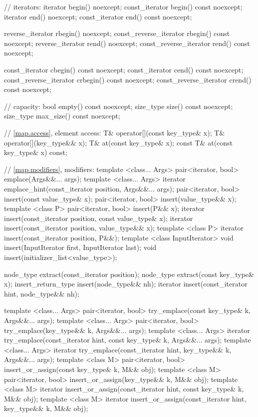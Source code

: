 \begin{codeblock}
{{    // iterators:
    iterator               begin() noexcept;
    const_iterator         begin() const noexcept;
    iterator               end() noexcept;
    const_iterator         end() const noexcept;

    reverse_iterator       rbegin() noexcept;
    const_reverse_iterator rbegin() const noexcept;
    reverse_iterator       rend() noexcept;
    const_reverse_iterator rend() const noexcept;

    const_iterator         cbegin() const noexcept;
    const_iterator         cend() const noexcept;
    const_reverse_iterator crbegin() const noexcept;
    const_reverse_iterator crend() const noexcept;

    // capacity:
    bool      empty() const noexcept;
    size_type size() const noexcept;
    size_type max_size() const noexcept;

    // \ref{map.access}, element access:
    T& operator[](const key_type& x);
    T& operator[](key_type&& x);
    T&       at(const key_type& x);
    const T& at(const key_type& x) const;

    // \ref{map.modifiers}, modifiers:
    template <class... Args> pair<iterator, bool> emplace(Args&&... args);
    template <class... Args> iterator emplace_hint(const_iterator position, Args&&... args);
    pair<iterator, bool> insert(const value_type& x);
    pair<iterator, bool> insert(value_type&& x);
    template <class P> pair<iterator, bool> insert(P&& x);
    iterator insert(const_iterator position, const value_type& x);
    iterator insert(const_iterator position, value_type&& x);
    template <class P>
      iterator insert(const_iterator position, P&&);
    template <class InputIterator>
      void insert(InputIterator first, InputIterator last);
    void insert(initializer_list<value_type>);

    node_type extract(const_iterator position);
    node_type extract(const key_type& x);
    insert_return_type insert(node_type&& nh);
    iterator           insert(const_iterator hint, node_type&& nh);

    template <class... Args>
      pair<iterator, bool> try_emplace(const key_type& k, Args&&... args);
    template <class... Args>
      pair<iterator, bool> try_emplace(key_type&& k, Args&&... args);
    template <class... Args>
      iterator try_emplace(const_iterator hint, const key_type& k, Args&&... args);
    template <class... Args>
      iterator try_emplace(const_iterator hint, key_type&& k, Args&&... args);
    template <class M>
      pair<iterator, bool> insert_or_assign(const key_type& k, M&& obj);
    template <class M>
      pair<iterator, bool> insert_or_assign(key_type&& k, M&& obj);
    template <class M>
      iterator insert_or_assign(const_iterator hint, const key_type& k, M&& obj);
    template <class M>
      iterator insert_or_assign(const_iterator hint, key_type&& k, M&& obj);

}}
\end{codeblock}
